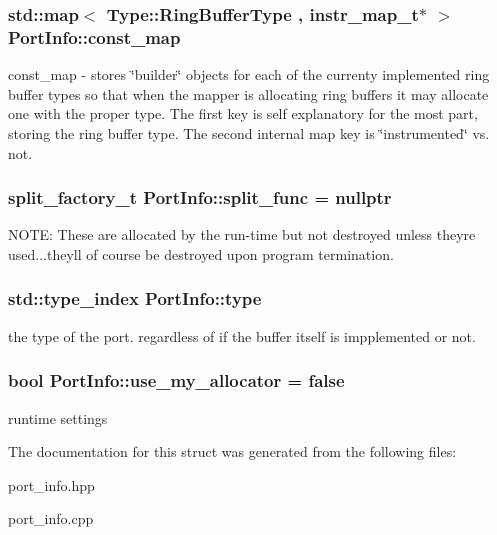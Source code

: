 \subsubsection[{const\+\_\+map}]{\setlength{\rightskip}{0pt plus 5cm}std\+::map$<$ Type\+::\+Ring\+Buffer\+Type , instr\+\_\+map\+\_\+t$\ast$ $>$ Port\+Info\+::const\+\_\+map}\label{struct_port_info_a714592b5ab1fa47b599903639b102a66}
const\+\_\+map -\/ stores \char`\"{}builder\char`\"{} objects for each of the currenty implemented ring buffer types so that when the mapper is allocating ring buffers it may allocate one with the proper type. The first key is self explanatory for the most part, storing the ring buffer type. The second internal map key is \char`\"{}instrumented\char`\"{} vs. not. \hypertarget{struct_port_info_a6b7e8758b84288a4378233251252be77}{}
\subsubsection[{split\+\_\+func}]{\setlength{\rightskip}{0pt plus 5cm}split\+\_\+factory\+\_\+t Port\+Info\+::split\+\_\+func = nullptr}\label{struct_port_info_a6b7e8758b84288a4378233251252be77}
N\+O\+T\+E\+: These are allocated by the run-\/time but not destroyed unless they\textquotesingle{}re used...they\textquotesingle{}ll of course be destroyed upon program termination. \hypertarget{struct_port_info_a669818f0fde1da7b4a294c46e08d5980}{}
\subsubsection[{type}]{\setlength{\rightskip}{0pt plus 5cm}std\+::type\+\_\+index Port\+Info\+::type}\label{struct_port_info_a669818f0fde1da7b4a294c46e08d5980}
the type of the port. regardless of if the buffer itself is impplemented or not. \hypertarget{struct_port_info_a5da81ef07f28858445aa768700948cf2}{}
\subsubsection[{use\+\_\+my\+\_\+allocator}]{\setlength{\rightskip}{0pt plus 5cm}bool Port\+Info\+::use\+\_\+my\+\_\+allocator = false}\label{struct_port_info_a5da81ef07f28858445aa768700948cf2}
runtime settings 

The documentation for this struct was generated from the following files\+:\begin{DoxyCompactItemize}
\item 
port\+\_\+info.\+hpp\item 
port\+\_\+info.\+cpp\end{DoxyCompactItemize}
